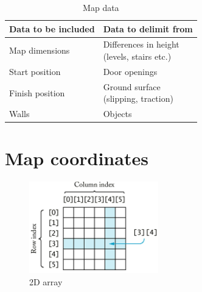 \begin{table}[h!]
	\centering
	\caption{Map data}
	\begin{tabular}{|p{}||p{}|}
		\hline
		Data to be included & Data to delimit from \\ 
		\hline
		\hline
		Map dimensions 		& \parbox[t]{0.4\textwidth}{Differences in height\\(levels, stairs etc.)}\\
		\hline
		Start position 		& Door openings \\
		\hline
		Finish position 	& \parbox[t]{0.4\textwidth}{Ground surface\\(slipping, traction)} \\
		\hline
		Walls 				& Objects\\
		\hline
	\end{tabular}
	\label{table:map_data}
\end{table}


\section{Map coordinates}
\label{sec:map_coordinates} %

\begin{figure}[h!tp]
    \centering
    \includegraphics[width=0.5\textwidth]{figures/map/2d-array.png}%
    \caption{2D array}
    \label{fig:2d-array}
\end{figure}

